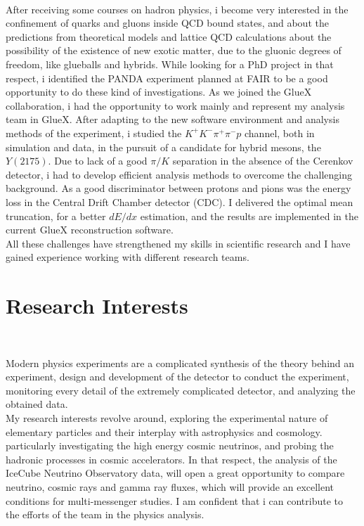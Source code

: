 \documentclass[a4paper,roman]{article}
\begin{document}
~\par After receiving some courses on hadron physics, i become very interested in the confinement of quarks and gluons inside QCD bound states, and about the predictions from theoretical models and lattice QCD calculations about the possibility of the existence of new exotic matter, due to the gluonic degrees of freedom, like glueballs and hybrids. While looking for a PhD project in that respect, i identified the PANDA experiment planned at FAIR to be a good opportunity to do these kind of investigations. As we joined the GlueX collaboration, i had the opportunity to work mainly and represent my analysis team in GlueX. After adapting to the new software environment and analysis methods of the experiment, i studied the $K^{+}K^{-}\pi^{+}\pi^{-}p$ channel, both in simulation and data, in the pursuit of a candidate for hybrid mesons, the $Y(2175)$. Due to lack of a good $\pi/K$ separation in the absence of the Cerenkov detector, i had to develop efficient analysis methods to overcome the challenging background. As a good discriminator between protons and pions was the energy loss in the Central Drift Chamber detector (CDC). I delivered the optimal mean truncation, for a better $dE/dx$ estimation, and the results are implemented in the current GlueX reconstruction software.\\
All these challenges have strengthened my skills in scientific research and I have gained experience working with different research teams.

\section*{Research Interests}
~\par Modern physics experiments are a complicated synthesis of the theory behind an experiment, design and development of the detector to conduct the experiment, monitoring every detail of the extremely complicated detector, and analyzing the obtained data.\\
My research interests revolve around, exploring the experimental nature of elementary particles and their interplay with astrophysics and cosmology. particularly investigating the high energy cosmic neutrinos, and probing the hadronic processes in cosmic accelerators. In that respect, the analysis of the IceCube Neutrino Observatory data, will open a great opportunity to compare neutrino, cosmic rays and gamma ray fluxes, which will provide an excellent conditions for multi-messenger studies. I am confident that i can contribute to the efforts of the team in the physics analysis.
\end{document}
